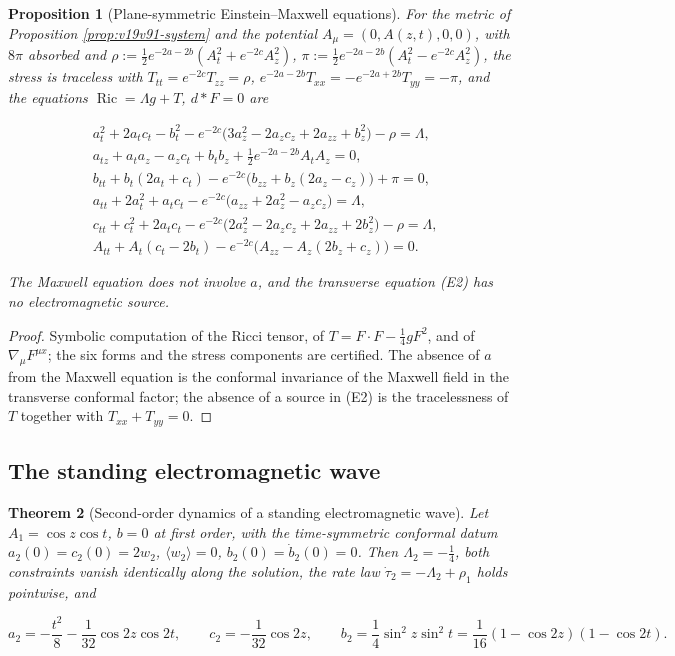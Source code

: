 \documentclass[11pt]{article}
\newtheorem{theorem}{Theorem}[section]
\newtheorem{proposition}[theorem]{Proposition}
\theoremstyle{remark}
\begin{document}
\begin{proposition}[Plane-symmetric Einstein--Maxwell equations]
\label{prop:v19v99-system}
For the metric of Proposition \ref{prop:v19v91-system} and the
potential \(A_\mu=(0,A(z,t),0,0)\), with \(8\pi\) absorbed and
\(\rho:=\tfrac12e^{-2a-2b}(A_t^2+e^{-2c}A_z^2)\),
\(\pi:=\tfrac12e^{-2a-2b}(A_t^2-e^{-2c}A_z^2)\), the stress is
traceless with \(T_{tt}=e^{-2c}T_{zz}=\rho\),
\(e^{-2a-2b}T_{xx}=-e^{-2a+2b}T_{yy}=-\pi\), and the equations
\(\operatorname{Ric}=\Lambda g+T\), \(d{*}F=0\) are

\[
\begin{aligned}
 &a_t^2+2a_tc_t-b_t^2-e^{-2c}\bigl(3a_z^2-2a_zc_z+2a_{zz}+b_z^2\bigr)-\rho=\Lambda,\\
 &a_{tz}+a_ta_z-a_zc_t+b_tb_z+\tfrac12e^{-2a-2b}A_tA_z=0,\\
 &b_{tt}+b_t(2a_t+c_t)-e^{-2c}\bigl(b_{zz}+b_z(2a_z-c_z)\bigr)+\pi=0,\\
 &a_{tt}+2a_t^2+a_tc_t-e^{-2c}\bigl(a_{zz}+2a_z^2-a_zc_z\bigr)=\Lambda,\\
 &c_{tt}+c_t^2+2a_tc_t-e^{-2c}\bigl(2a_z^2-2a_zc_z+2a_{zz}+2b_z^2\bigr)-\rho=\Lambda,\\
 &A_{tt}+A_t(c_t-2b_t)-e^{-2c}\bigl(A_{zz}-A_z(2b_z+c_z)\bigr)=0.
\end{aligned}                                                          \tag{102.1}
\]

The Maxwell equation does not involve \(a\), and the transverse
equation (E2) has no electromagnetic source.
\end{proposition}

\begin{proof}
Symbolic computation of the Ricci tensor, of \(T=F\cdot F-\tfrac14gF^2\),
and of \(\nabla_\mu F^{\mu x}\); the six forms and the stress
components are certified.  The absence of \(a\) from the Maxwell
equation is the conformal invariance of the Maxwell field in the
transverse conformal factor; the absence of a source in (E2) is the
tracelessness of \(T\) together with \(T_{xx}+T_{yy}=0\).
\end{proof}

\subsection{The standing electromagnetic wave}

\begin{theorem}[Second-order dynamics of a standing electromagnetic wave]
\label{thm:v19v99-wave}
Let \(A_1=\cos z\cos t\), \(b=0\) at first order, with the
time-symmetric conformal datum \(a_2(0)=c_2(0)=2w_2\),
\(\langle w_2\rangle=0\), \(b_2(0)=\dot b_2(0)=0\).  Then
\(\Lambda_2=-\tfrac14\), both constraints vanish identically along the
solution, the rate law \(\dot\tau_2=-\Lambda_2+\rho_1\) holds
pointwise, and

\[
 a_2=-\frac{t^2}8-\frac1{32}\cos2z\cos2t,\qquad
 c_2=-\frac1{32}\cos2z,\qquad
 b_2=\frac14\sin^2z\sin^2t=\frac1{16}(1-\cos2z)(1-\cos2t).            \tag{102.2}
\]
\end{theorem}
\end{document}
